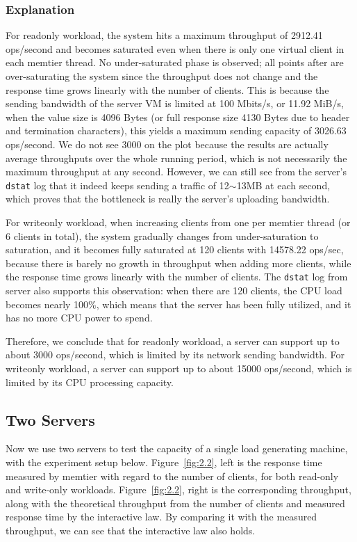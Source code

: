 \subsubsection{Explanation}

For readonly workload, the system hits a maximum throughput of 2912.41 ops/second and becomes saturated even when there is only one virtual client in each memtier thread. No under-saturated phase is observed; all points after are over-saturating the system since the throughput does not change and the response time grows linearly with the number of clients. This is because the sending bandwidth of the server VM is limited at 100 Mbits/s, or 11.92 MiB/s, when the value size is 4096 Bytes (or full response size 4130 Bytes due to header and termination characters), this yields a maximum sending capacity of 3026.63 ops/second. We do not see 3000 on the plot because the results are actually average throughputs over the whole running period, which is not necessarily the maximum throughput at any second. However, we can still see from the server's \texttt{dstat} log that it indeed keeps sending a traffic of 12$\sim$13MB at each second, which proves that the bottleneck is really the server's uploading bandwidth.

For writeonly workload, when increasing clients from one per memtier thread (or 6 clients in total), the system gradually changes from under-saturation to saturation, and it becomes fully saturated at 120 clients with 14578.22 ops/sec, because there is barely no growth in throughput when adding more clients, while the response time grows linearly with the number of clients. The \texttt{dstat} log from server also supports this observation: when there are 120 clients, the CPU load becomes nearly 100\%, which means that the server has been fully utilized, and it has no more CPU power to spend.

Therefore, we conclude that for readonly workload, a server can support up to about 3000 ops/second, which is limited by its network sending bandwidth. For writeonly workload, a server can support up to about 15000 ops/second, which is limited by its CPU processing capacity.

\subsection{Two Servers}

Now we use two servers to test the capacity of a single load generating machine, with the experiment setup below. Figure~\ref{fig:2.2}, left is the response time measured by memtier with regard to the number of clients, for both read-only and write-only workloads. Figure~\ref{fig:2.2}, right is the corresponding throughput, along with the theoretical throughput from the number of clients and measured response time by the interactive law. By comparing it with the measured throughput, we can see that the interactive law also holds. 

